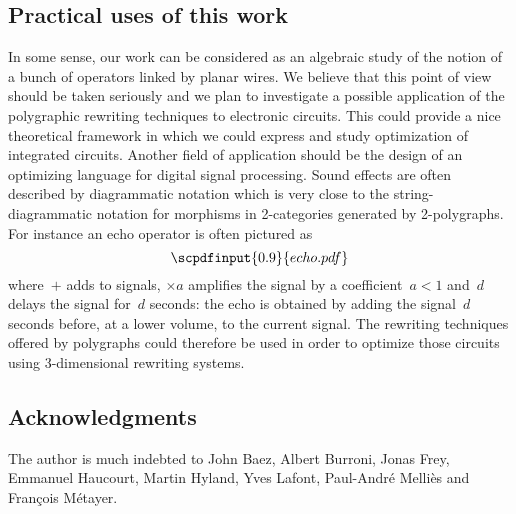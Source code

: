 \documentclass{LMCS}
\newcommand{\strid}[1]{\scpdfinput{0.9}{#1.pdf}}
\begin{document}
\subsection{Practical uses of this work}
In some sense, our work can be considered as an algebraic study of the notion of
a bunch of operators linked by planar wires. We believe that this point of view
should be taken seriously and we plan to investigate a possible application of
the polygraphic rewriting techniques to electronic circuits. This could provide
a nice theoretical framework in which we could express and study optimization of
integrated circuits. Another field of application should be the design of an
optimizing language for digital signal processing. Sound effects are often
described by diagrammatic notation which is very close to the
string-diagrammatic notation for morphisms in 2-categories generated by
2-polygraphs. For instance an echo operator is often pictured as
\[
\strid{echo}
\]
where~$+$ adds to signals, $\times a$ amplifies the signal by a
coefficient~$a<1$ and~$d$ delays the signal for~$d$ seconds: the echo is
obtained by adding the signal~$d$ seconds before, at a lower volume, to the
current signal. The rewriting techniques offered by polygraphs could therefore
be used in order to optimize those circuits using 3-dimensional rewriting
systems.



\subsection*{Acknowledgments}
The author is much indebted to John Baez, Albert Burroni, Jonas Frey, Emmanuel
Haucourt, Martin Hyland, Yves Lafont, Paul-André Melliès and François Métayer.



\end{document}
